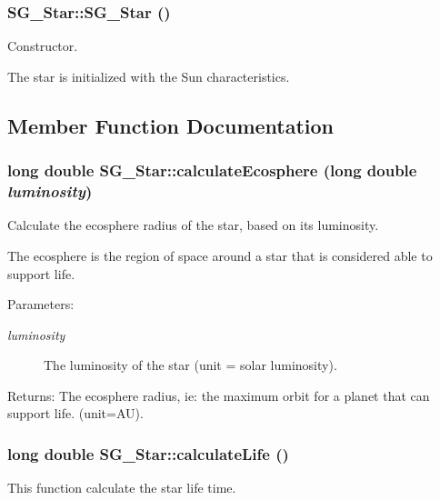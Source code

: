 \subsubsection{\setlength{\rightskip}{0pt plus 5cm}SG\_\-Star::SG\_\-Star ()}\label{class_s_g___star_a0}


Constructor. 

The star is initialized with the Sun characteristics. 

\subsection{Member Function Documentation}
\subsubsection{\setlength{\rightskip}{0pt plus 5cm}long double SG\_\-Star::calculate\-Ecosphere (long double {\em luminosity})\hspace{0.3cm}{\tt  [protected]}}\label{class_s_g___star_b1}


Calculate the ecosphere radius of the star, based on its luminosity. 

The ecosphere is the region of space around a star that is considered able to support life. \begin{Desc}
\item[Parameters:]
\begin{description}
\item[{\em luminosity}]The luminosity of the star (unit = solar luminosity). \end{description}
\end{Desc}
\begin{Desc}
\item[Returns:]The ecosphere radius, ie: the maximum orbit for a planet that can support life. (unit=AU). \end{Desc}
\subsubsection{\setlength{\rightskip}{0pt plus 5cm}long double SG\_\-Star::calculate\-Life ()\hspace{0.3cm}{\tt  [protected]}}\label{class_s_g___star_b2}


This function calculate the star life time. 

